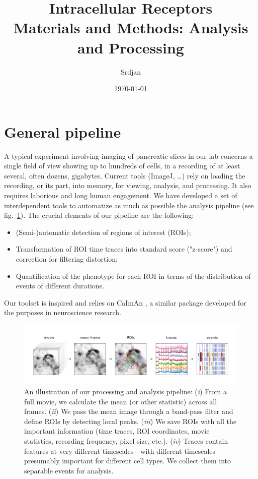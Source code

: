 \documentclass[a4paper,11pt,oneside,]{article}
\title{Intracellular Receptors \\ {\small Materials and Methods: Analysis and Processing}}
\author{Srdjan}
\date{\today}
\begin{document}
\maketitle


\section{General pipeline}

A typical experiment involving imaging of pancreatic slices in our lab concerns a single field of view
showing up to hundreds of cells, in a recording of at least several, often dozens, gigabytes.
Current tools (ImageJ, \dots) rely on loading the recording, or its part, into memory, for viewing, analysis, and processing.
It also requires laborious and long human engagement.
We have developed a set of interdependent tools to automatize as much as possible the analysis pipeline (see fig.~\ref{fig:pipeline}). 
The crucial elements of our pipeline are the following:
\begin{itemize}
\item (Semi-)automatic detection of regions of interest (ROIs);
\item Transformation of ROI time traces into standard score ("z-score") and correction for filtering distortion;
\item Quantification of the phenotype for each ROI in terms of the distribution of events of different durations.
\end{itemize}

Our toolset is inspired and relies on CaImAn \cite{giovannucci2019caiman}, a similar package developed for the purposes in neuroscience research.


\begin{figure}[h]
\centering
\includegraphics[width=\textwidth,trim=1.5cm 1.5cm 15mm 15mm,clip]{figures/pipeline.pdf}
\caption{
\label{fig:pipeline}
An illustration of our processing and analysis pipeline:
({\it i})  From a full movie, we calculate the mean (or other statistic) across all frames.
({\it ii}) We pass the mean image through a band-pass filter and define ROIs by detecting local peaks.
({\it iii}) We save ROIs with all the important information (time traces, ROI coordinates, movie statistics, recording frequency, pixel size, etc.).
({\it iv}) Traces contain features at very different timescales---with different timescales presumably important for different cell types. We collect them into separable events for analysis.
}
\end{figure}
\end{document}
